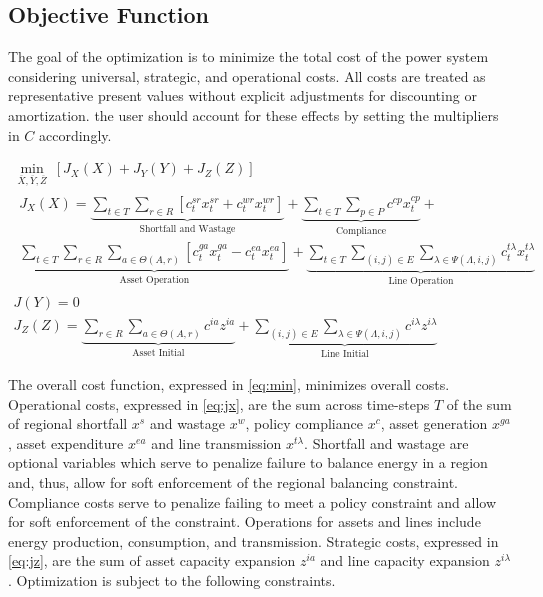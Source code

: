 \subsection{Objective Function}

The goal of the optimization is to minimize the total cost of the power system considering universal, strategic, and operational costs. All costs are treated as representative present values without explicit adjustments for discounting or amortization. the user should account for these effects by setting the multipliers in $C$ accordingly.

\begin{gather}
	\min_{\overline{X}, \overline{Y}, \overline{Z}} \ \left[J_X(X) +  J_Y(Y) + J_Z(Z) \right]\label{eq:min} \\
	\begin{gathered}	
		J_X(X) = \underbrace{\sum_{t \in T}\sum_{r \in R} [c^{sr}_t x^{sr}_{t} + c^{wr}_t x^{wr}_{t}]}_{\text{Shortfall and Wastage}} + \underbrace{\sum_{t \in T}\sum_{p \in P} c^{cp} x^{cp}_t}_{\text{Compliance}} + \\\underbrace{\sum_{t \in T}\sum_{r \in R}\sum_{a \in \Theta(A, r)} \left[c^{ga}_t x^{ga}_t - c^{ea}_t x^{ea}_t \right]}_{\text{Asset Operation}} + \underbrace{\sum_{t \in T}\sum_{(i, j) \in E}\sum_{\lambda \in \Psi(\Lambda, i, j)} c^{t\lambda}_t x^{t\lambda}_t}_{\text{Line Operation}}\label{eq:jx} 
	\end{gathered}\\
	J(Y) = 0 \label{eq:jy} \\
	J_Z(Z) = \underbrace{\sum_{r \in R}\sum_{a \in \Theta(A, r)} c^{ia} z^{ia}}_{\text{Asset Initial}} + \underbrace{\sum_{(i, j) \in E}\sum_{\lambda \in \Psi(\Lambda, i, j)} c^{i\lambda} z^{i\lambda}}_{\text{Line Initial}}\label{eq:jz}
\end{gather}

The overall cost function, expressed in \eqref{eq:min}, minimizes overall costs. Operational costs, expressed in  \eqref{eq:jx}, are the sum across time-steps $T$ of the sum of regional shortfall $x^s$ and wastage $x^w$, policy compliance $x^c$, asset generation $x^{ga}$, asset expenditure $x^{ea}$ and line transmission $x^{t\lambda}$. Shortfall and wastage are optional variables which serve to penalize failure to balance energy in a region and, thus, allow for soft enforcement of the regional balancing constraint. Compliance costs serve to penalize failing to meet a policy constraint and allow for soft enforcement of the constraint. Operations for assets and lines include energy production, consumption, and transmission. Strategic costs, expressed in \eqref{eq:jz}, are the sum of asset capacity expansion $z^{ia}$ and line capacity expansion $z^{i\lambda}$. Optimization is subject to the following constraints.

